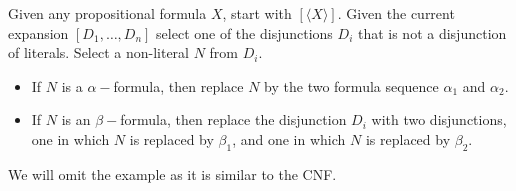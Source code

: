 \documentclass[a4paper]{article}
\theoremstyle{plain}
\newtheorem{thm}{Theorem}[section]
\theoremstyle{definition}
\theoremstyle{remark}
\begin{document}
\begin{tcolorbox}[colback=black!3!white,colframe=black!60!white,title=\begin{thm}Disjunctive Normal Form Algorithm \label{Disjunctive Normal Form Algorithm}\end{thm}]
	Given any propositional formula $X$, start with $[\langle X\rangle]$. Given the current expansion  $[D_1,\ldots,D_n]$ select one of the disjunctions $D_i$ that is not a disjunction of literals. Select a non-literal $N$ from $D_i$. 
	\begin{itemize}
		\item If $N$ is a $\alpha-$formula, then replace $N$ by the two formula sequence $\alpha_1$ and $\alpha_2$.
		\item If $N$ is an $\beta-$formula, then replace the disjunction $D_i$ with two disjunctions, one in which $N$ is replaced by $\beta_1$, and one in which $N$ is replaced by $\beta_2$.
	\end{itemize}
	We will omit the example as it is similar to the CNF.
\end{tcolorbox}
\end{document}
